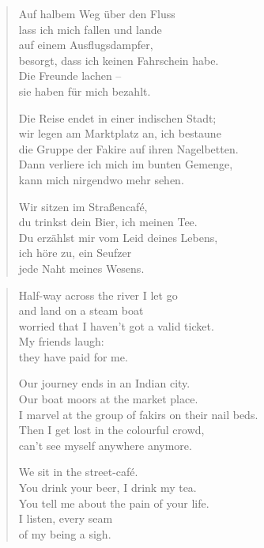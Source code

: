 \clearpage

\begin{verse}

Auf halbem Weg über den Fluss\\
lass ich mich fallen und lande\\
auf einem Ausflugsdampfer,\\
besorgt, dass ich keinen Fahrschein habe.\\
Die Freunde lachen --\\
sie haben für mich bezahlt.

\rhytmbreak

Die Reise endet in einer indischen Stadt;\\
wir legen am Marktplatz an, ich bestaune\\
die Gruppe der Fakire auf ihren Nagelbetten.\\
Dann verliere ich mich im bunten Gemenge,\\
kann mich nirgendwo mehr sehen.

\rhytmbreak

Wir sitzen im Straßencafé,\\
du trinkst dein Bier, ich meinen Tee.\\
Du erzählst mir vom Leid deines Lebens,\\
ich höre zu, ein Seufzer\\
jede Naht meines Wesens.

\rhytmbreak

\end{verse}

\clearpage

\begin{verse}
Half-way across the river I let go\\
and land on a steam boat\\
worried that I haven't got a valid ticket.\\
My friends laugh:\\
they have paid for me.

\rhytmbreak

Our journey ends in an Indian city.\\
Our boat moors at the market place.\\
I marvel at the group of fakirs on their nail beds.\\
Then I get lost in the colourful crowd,\\
can't see myself anywhere anymore.

\rhytmbreak

We sit in the street-café.\\
You drink your beer, I drink my tea.\\
You tell me about the pain of your life.\\
I listen, every seam\\
of my being a sigh.

\rhytmbreak
\end{verse}


